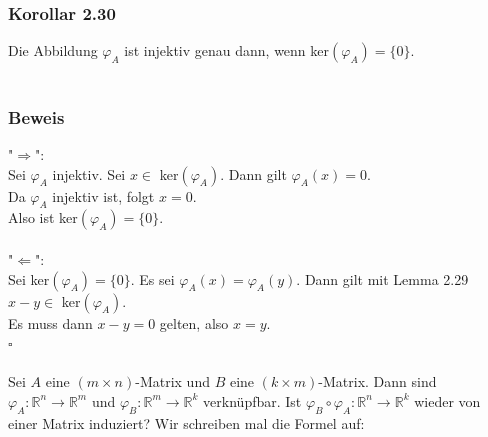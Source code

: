 \documentclass{article}
\begin{document}
\subsubsection*{Korollar 2.30}
Die Abbildung $\varphi_A$ ist injektiv genau dann, wenn ker$(\varphi_A) = \{0\}$. \\
\\
\subsubsection*{Beweis}
"$\Rightarrow$": \\
Sei $\varphi_A$ injektiv. Sei $x \in$ ker$(\varphi_A)$. Dann gilt $\varphi_A(x) = 0$. \\
Da $\varphi_A$ injektiv ist, folgt $x=0$. \\
Also ist ker$(\varphi_A) = \{0\}$. \\
\\
"$\Leftarrow$": \\
Sei ker$(\varphi_A) = \{0\}$. Es sei $\varphi_A(x) = \varphi_A(y)$. Dann gilt mit Lemma 2.29 $x-y \in$ ker$(\varphi_A)$. \\
Es muss dann $x-y = 0$ gelten, also $x=y$. \\
$\square$ \\
\\
Sei $A$ eine $(m \times n)$-Matrix und $B$ eine $(k \times m)$-Matrix. Dann sind $\varphi_A: \mathbb{R}^n \rightarrow \mathbb{R}^m$ und $\varphi_B: \mathbb{R}^m \rightarrow \mathbb{R}^k$ verknüpfbar. 
Ist $\varphi_B \circ \varphi_A: \mathbb{R}^n \rightarrow \mathbb{R}^k$ wieder von einer Matrix induziert? Wir schreiben mal die Formel auf: \\
\end{document}
